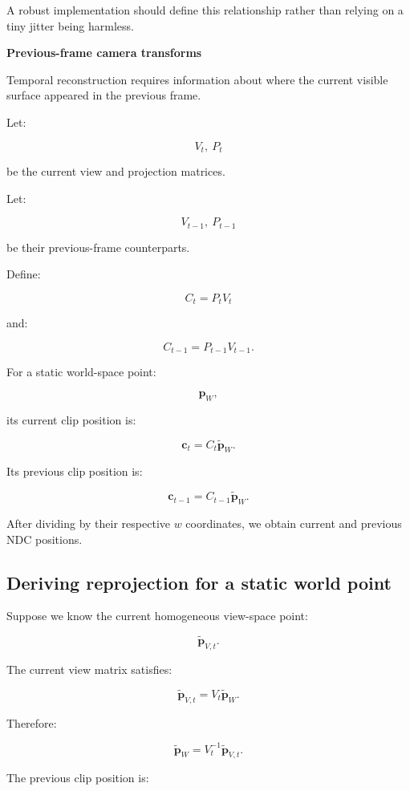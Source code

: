 A robust implementation should define this relationship rather than relying on a tiny jitter being harmless.

\textbf{Previous-frame camera transforms}

Temporal reconstruction requires information about where the current visible surface appeared in the previous frame.

Let:

\[
 V_t,\ P_t
\]

be the current view and projection matrices.

Let:

\[
 V_{t-1},\ P_{t-1}
\]

be their previous-frame counterparts.

Define:

\[
 \boxed{ C_t=P_tV_t }
\]

and:

\[
 \boxed{ C_{t-1}=P_{t-1}V_{t-1} }.
\]

For a static world-space point:

\[
 \mathbf p_W,
\]

its current clip position is:

\[
 \boxed{ \mathbf c_t=C_t\tilde{\mathbf p}_W }.
\]

Its previous clip position is:

\[
 \boxed{ \mathbf c_{t-1}=C_{t-1}\tilde{\mathbf p}_W }.
\]

After dividing by their respective \(w\) coordinates, we obtain current and previous NDC positions.

\subsection{Deriving reprojection for a static world point}\label{02-foundations-ii-ch036-deriving-reprojection-for-a-static-world-point}

\hypertarget{02-foundations-ii-ch036-deriving-reprojection-for-a-static-world-point}{}

Suppose we know the current homogeneous view-space point:

\[
 \tilde{\mathbf p}_{V,t}.
\]

The current view matrix satisfies:

\[
 \tilde{\mathbf p}_{V,t} = V_t\tilde{\mathbf p}_W.
\]

Therefore:

\[
 \tilde{\mathbf p}_W= V_t^{-1}\tilde{\mathbf p}_{V,t}.
\]

The previous clip position is:

